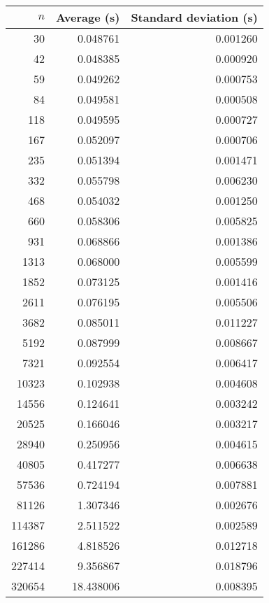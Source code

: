 \begin{tabular}{rrr}
$n$ & Average (s) & Standard deviation (s)\\\hline
30 & 0.048761 & 0.001260\\
42 & 0.048385 & 0.000920\\
59 & 0.049262 & 0.000753\\
84 & 0.049581 & 0.000508\\
118 & 0.049595 & 0.000727\\
167 & 0.052097 & 0.000706\\
235 & 0.051394 & 0.001471\\
332 & 0.055798 & 0.006230\\
468 & 0.054032 & 0.001250\\
660 & 0.058306 & 0.005825\\
931 & 0.068866 & 0.001386\\
1313 & 0.068000 & 0.005599\\
1852 & 0.073125 & 0.001416\\
2611 & 0.076195 & 0.005506\\
3682 & 0.085011 & 0.011227\\
5192 & 0.087999 & 0.008667\\
7321 & 0.092554 & 0.006417\\
10323 & 0.102938 & 0.004608\\
14556 & 0.124641 & 0.003242\\
20525 & 0.166046 & 0.003217\\
28940 & 0.250956 & 0.004615\\
40805 & 0.417277 & 0.006638\\
57536 & 0.724194 & 0.007881\\
81126 & 1.307346 & 0.002676\\
114387 & 2.511522 & 0.002589\\
161286 & 4.818526 & 0.012718\\
227414 & 9.356867 & 0.018796\\
320654 & 18.438006 & 0.008395\\
\end{tabular}
